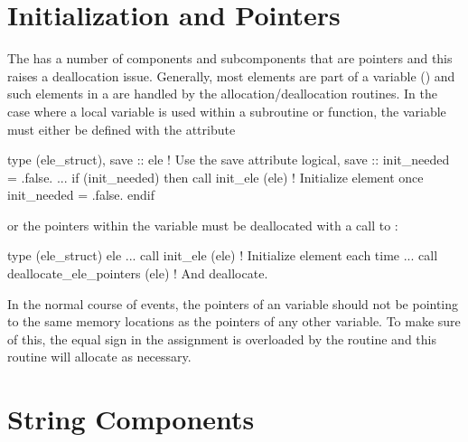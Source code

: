 \section{Initialization and Pointers}

The  has a number of components and subcomponents 
that are pointers and this raises a deallocation issue.
Generally, most  elements are part of a 
variable ()
and such elements in a  are handled by the
 allocation/deallocation routines. 
In the case where a local 
variable is used within a subroutine or function, the  
variable must either be defined with the  attribute 
\begin{example}
  type (ele_struct), save :: ele          ! Use the save attribute
  logical, save :: init_needed = .false.
  ...
  if (init_needed) then
    call init_ele (ele)                ! Initialize element once
    init_needed = .false.
  endif
\end{example}
or the pointers within the variable must be deallocated  with a call to
:
\begin{example}
  type (ele_struct) ele  
  ...
  call init_ele (ele)                ! Initialize element each time
  ...
  call deallocate_ele_pointers (ele) ! And deallocate.
\end{example}

In the normal course of events, the pointers of an  variable
should not be pointing to the same memory locations as the pointers
of any other  variable. To make sure of this,
the equal sign in the assignment 
is overloaded by the routine 
and this routine will allocate as necessary.

\section{String Components}
\label{s:ele.string}

